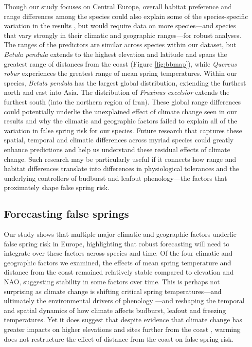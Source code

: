 \documentclass{article}\usepackage[]{graphicx}\usepackage[]{color}
\newcommand{\R}[1]{\label{#1}\linelabel{#1}}
\begin{document}
\R{Z1ranges}Though our study focuses on Central Europe, overall habitat preference and range differences among the species could also explain some of the species-specific variation in the results \citep{Chuine2001}, but would require data on more species---and species that vary strongly in their climatic and geographic ranges---for robust analyses. The ranges of the predictors are similar across species within our dataset, but \textit{Betula pendula} extends to the highest elevation and latitude and spans the greatest range of distances from the coast (Figure \ref{fig:bbmap}), while \textit{Quercus robur} experiences the greatest range of mean spring temperatures. Within our species, \textit{Betula pendula} has the largest global distribution, extending the furthest north and east into Asia. The distribution of \textit{Fraxinus excelsior} extends the furthest south (into the northern region of Iran). These global range differences could potentially underlie the unexplained effect of climate change seen in our results and why the climatic and geographic factors failed to explain all of the variation in false spring risk for our species. Future research that captures these spatial, temporal and climatic differences across myriad species could greatly enhance predictions and help us understand these residual effects of climate change. Such research may be particularly useful if it connects how range and habitat differences translate into differences in physiological tolerances and the underlying controllers of budburst and leafout phenology---the factors that proximately shape false spring risk\R{Z1rangesend}.

\subsection*{Forecasting false springs}
Our study shows that multiple major climatic and geographic factors underlie false spring risk in Europe, highlighting that robust forecasting will need to integrate over these factors across species and time. Of the four climatic and geographic factors we examined, the effects of mean spring temperature and distance from the coast remained relatively stable compared to elevation and NAO, suggesting stability in some factors over time. This is perhaps not surprising as climate change is shifting critical spring temperatures---and ultimately the environmental drivers of phenology \citep{Gauzere2019}---and reshaping the temporal and spatial dynamics of how climate affects budburst, leafout and freezing temperatures.  Yet it does suggest that despite evidence that climate change has greater impacts on higher elevations and sites further from the coast \citep{Giorgi1997,Rangwala2012,Pepin2015,Vitasse2018}, warming does not restructure the effect of distance from the coast on false spring risk.
\end{document}
